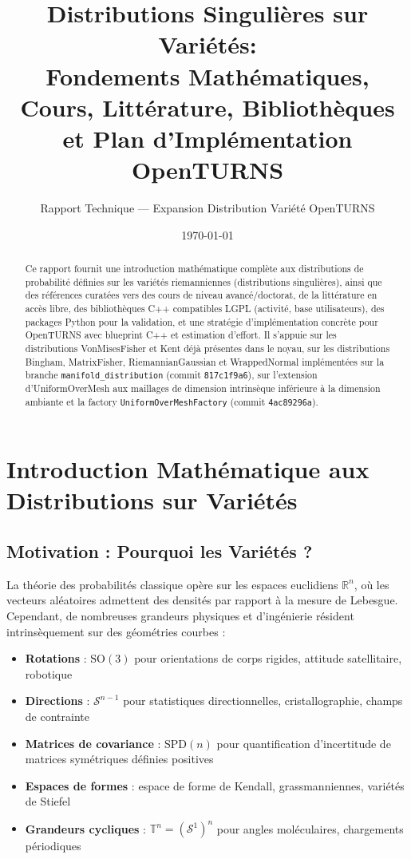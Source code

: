 \documentclass[11pt,a4paper]{article}
\title{\textbf{Distributions Singulières sur Variétés:\\Fondements Mathématiques, Cours, Littérature, Bibliothèques et Plan d'Implémentation OpenTURNS}}
\author{Rapport Technique --- Expansion Distribution Variété OpenTURNS}
\date{\today}
\begin{document}
\maketitle

\begin{abstract}
Ce rapport fournit une introduction mathématique complète aux distributions de probabilité définies sur les variétés riemanniennes (distributions singulières), ainsi que des références curatées vers des cours de niveau avancé/doctorat, de la littérature en accès libre, des bibliothèques C++ compatibles LGPL (activité, base utilisateurs), des packages Python pour la validation, et une stratégie d'implémentation concrète pour OpenTURNS avec blueprint C++ et estimation d'effort. Il s'appuie sur les distributions VonMisesFisher et Kent déjà présentes dans le noyau, sur les distributions Bingham, MatrixFisher, RiemannianGaussian et WrappedNormal implémentées sur la branche \texttt{manifold\_distribution} (commit \texttt{817c1f9a6}), sur l'extension d'UniformOverMesh aux maillages de dimension intrinsèque inférieure à la dimension ambiante et la factory \texttt{UniformOverMeshFactory} (commit \texttt{4ac89296a}).
\end{abstract}

\tableofcontents

\section{Introduction Mathématique aux Distributions sur Variétés}

\subsection{Motivation : Pourquoi les Variétés ?}
La théorie des probabilités classique opère sur les espaces euclidiens $\mathbb{R}^n$, où les vecteurs aléatoires admettent des densités par rapport à la mesure de Lebesgue. Cependant, de nombreuses grandeurs physiques et d'ingénierie résident intrinsèquement sur des géométries courbes :

\begin{itemize}
    \item \textbf{Rotations} : $\text{SO}(3)$ pour orientations de corps rigides, attitude satellitaire, robotique
    \item \textbf{Directions} : $\mathcal{S}^{n-1}$ pour statistiques directionnelles, cristallographie, champs de contrainte
    \item \textbf{Matrices de covariance} : $\text{SPD}(n)$ pour quantification d'incertitude de matrices symétriques définies positives
    \item \textbf{Espaces de formes} : espace de forme de Kendall, grassmanniennes, variétés de Stiefel
    \item \textbf{Grandeurs cycliques} : $\mathbb{T}^n = (\mathcal{S}^1)^n$ pour angles moléculaires, chargements périodiques
\end{itemize}
\end{document}
